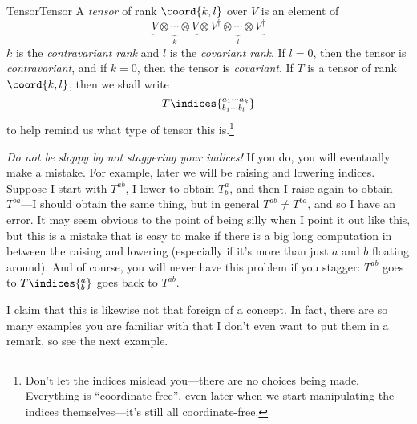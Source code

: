 \begin{dfn}{Tensor}{Tensor}
A \emph{tensor} of rank $\coord{k,l}$ over $V$ is an element of
\begin{equation}
\underbrace{V\otimes \cdots \otimes V}_k\otimes \underbrace{V^{\dagger}\otimes \cdots \otimes V^{\dagger}}_l
\end{equation}
$k$ is the \emph{contravariant rank} and $l$ is the \emph{covariant rank}.  If $l=0$, then the tensor is \emph{contravariant}, and if $k=0$, then the tensor is \emph{covariant}.  If $T$ is a tensor of rank $\coord{k,l}$, then we shall write
\begin{equation}
T\indices{^{a_1\cdots a_k}_{b_1\cdots b_l}}
\end{equation}
to help remind us what type of tensor this is.\footnote{Don't let the indices mislead you---there are no choices being made.  Everything is ``coordinate-free'', even later when we start manipulating the indices themselves---it's still all coordinate-free.}
\begin{rmk}
\emph{Do not be sloppy by not staggering your indices!}  If you do, you will eventually make a mistake.  For example, later we will be raising and lowering indices.  Suppose I start with $T^{ab}$, I lower to obtain $T_b^a$, and then I raise again to obtain $T^{ba}$---I should obtain the same thing, but in general $T^{ab}\neq T^{ba}$, and so I have an error.  It may seem obvious to the point of being silly when I point it out like this, but this is a mistake that is easy to make if there is a big long computation in between the raising and lowering (especially if it's more than just $a$ and $b$ floating around).  And of course, you will never have this problem if you stagger:  $T^{ab}$ goes to $T\indices{^a_b}$ goes back to $T^{ab}$.
\end{rmk}
\begin{rmk}
I claim that this is likewise not that foreign of a concept.  In fact, there are so many examples you are familiar with that I don't even want to put them in a remark, so see the next example.
\end{rmk}
\end{dfn}
